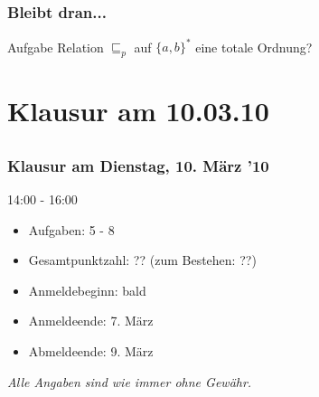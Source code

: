 \subsection*{}
\begin{frame}
  \frametitle{Bleibt dran...}

	\begin{block}{Aufgabe}
		Relation $\sqsubseteq_p$ auf $ \{a, b\}^* $ eine totale Ordnung?
	\end{block}
\end{frame}

\section[Klausur]{Klausur am 10.03.10}
\subsection*{}
\begin{frame}
	\frametitle{Klausur am Dienstag, 10. März '10}
	\begin{block}{14:00 - 16:00}
		\begin{itemize}
			\item Aufgaben: 5 - 8
			\item Gesamtpunktzahl: ?? (zum Bestehen: ??)
			\item Anmeldebeginn: bald
			\item Anmeldeende: 7. März
			\item Abmeldeende: 9. März
		\end{itemize}
  	\end{block}
  	\textit{Alle Angaben sind wie immer ohne Gewähr.}
\end{frame}

